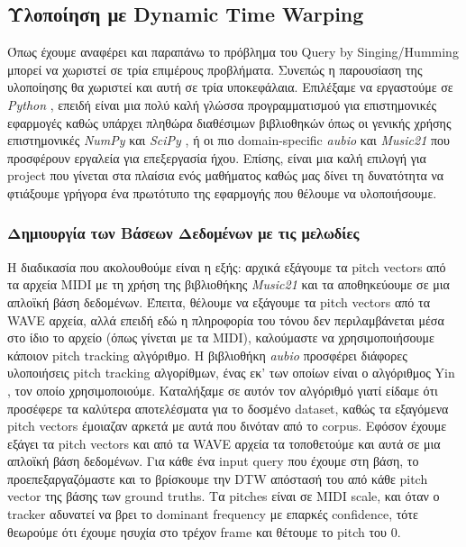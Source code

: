 \subsection{Υλοποίηση με Dynamic Time Warping}
Όπως έχουμε αναφέρει και παραπάνω το πρόβλημα του Query by Singing/Humming μπορεί να χωριστεί σε 
τρία επιμέρους προβλήματα. Συνεπώς η παρουσίαση της υλοποίησης θα χωριστεί και αυτή σε τρία υποκεφάλαια.
Επιλέξαμε να εργαστούμε σε \emph{Python} \cite{python}, επειδή είναι μια πολύ καλή γλώσσα προγραμματισμού για επιστημονικές εφαρμογές καθώς υπάρχει πληθώρα διαθέσιμων βιβλιοθηκών όπως οι γενικής χρήσης επιστημονικές
\emph{NumPy} \cite{numpy} και \emph{SciPy} \cite{scipy}, ή οι πιο domain-specific \emph{aubio} \cite{aubio} και \emph{Music21}
\cite{music21} που προσφέρουν εργαλεία για επεξεργασία ήχου. Επίσης, είναι μια καλή επιλογή για project που γίνεται στα πλαίσια ενός μαθήματος καθώς μας δίνει τη δυνατότητα να φτιάξουμε γρήγορα ένα πρωτότυπο της εφαρμογής που θέλουμε να υλοποιήσουμε.

\subsubsection{Δημιουργία των Βάσεων Δεδομένων με τις μελωδίες}
Η διαδικασία που ακολουθούμε είναι η εξής: αρχικά εξάγουμε τα pitch vectors από τα αρχεία MIDI με τη χρήση της βιβλιοθήκης \emph{Music21}
\cite{music21} και τα αποθηκεύουμε σε μια απλοϊκή βάση δεδομένων. Έπειτα, θέλουμε να εξάγουμε τα pitch vectors από τα WAVE αρχεία, αλλά επειδή εδώ η
πληροφορία του τόνου δεν περιλαμβάνεται μέσα στο ίδιο το αρχείο (όπως γίνεται με τα MIDI), καλούμαστε να χρησιμοποιήσουμε κάποιον pitch
tracking αλγόριθμο. Η βιβλιοθήκη \emph{aubio} \cite{aubio} προσφέρει διάφορες υλοποιήσεις pitch tracking αλγορίθμων, ένας εκ' των οποίων
είναι ο αλγόριθμος Yin \cite{de2002yin}, τον οποίο χρησιμοποιούμε. Καταλήξαμε σε αυτόν τον αλγόριθμό γιατί είδαμε ότι προσέφερε τα καλύτερα
αποτελέσματα για το δοσμένο dataset, καθώς τα εξαγόμενα pitch vectors έμοιαζαν αρκετά με αυτά που δινόταν από το corpus. Εφόσον έχουμε εξάγει τα pitch vectors
και από τα WAVE αρχεία τα τοποθετούμε και αυτά σε μια απλοϊκή βάση δεδομένων. Για κάθε ένα input query που έχουμε στη βάση, το
προεπεξαργαζόμαστε και το βρίσκουμε την DTW απόστασή του από κάθε pitch vector της βάσης των ground truths. Τα pitches είναι σε MIDI scale, και όταν
ο tracker αδυνατεί να βρει το dominant frequency με επαρκές confidence, τότε θεωρούμε ότι έχουμε ησυχία στο τρέχον frame και θέτουμε το
pitch του 0.

